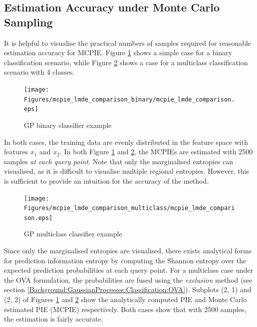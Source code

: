 		\subsection{Estimation Accuracy under Monte Carlo Sampling}
		
			It is helpful to visualise the practical numbers of samples required for reasonable estimation accuracy for MCPIE. Figure \ref{Figure:mcpie_lmde_comparison_binary} shows a simple case for a binary classification scenario, while Figure \ref{Figure:mcpie_lmde_comparison_multiclass} shows a case for a multiclass classification scenario with 4 classes. 
			
			\begin{figure}[!htbp]
				\centering
					\texttt{[image: Figures/mcpie\_lmde\_comparison\_binary/mcpie\_lmde\_comparison.eps]}
				\caption{GP binary classifier example}
				\label{Figure:mcpie_lmde_comparison_binary}
			\end{figure}			
						
			In both cases, the training data are evenly distributed in the feature space with features $x_{1}$ and $x_{2}$. In both Figure \ref{Figure:mcpie_lmde_comparison_binary} and \ref{Figure:mcpie_lmde_comparison_multiclass}, the MCPIEs are estimated with 2500 samples \textit{at each query point}. Note that only the marginalised entropies can visualised, as it is difficult to visualise multiple regional entropies. However, this is sufficient to provide an intuition for the accuracy of the method.
			
			\begin{figure}[!htbp]
				\centering
					\texttt{[image: Figures/mcpie\_lmde\_comparison\_multiclass/mcpie\_lmde\_comparison.eps]}
				\caption{GP multiclass classifier example}
				\label{Figure:mcpie_lmde_comparison_multiclass}
			\end{figure}
			
			Since only the marginalised entropies are visualised, there exists analytical forms for prediction information entropy by computing the Shannon entropy over the expected prediction probabilities at each query point. For a multiclass case under the OVA formulation, the probabilities are fused using the \textit{exclusion} method (see section  \ref{Background:GaussianProcesses:Classification:OVA}). Subplots (2, 1) and (2, 2) of Figures \ref{Figure:mcpie_lmde_comparison_binary} and \ref{Figure:mcpie_lmde_comparison_multiclass} show the analytically computed PIE and Monte Carlo estimated PIE (MCPIE) respectively. Both cases show that with 2500 samples, the estimation is fairly accurate.
			
